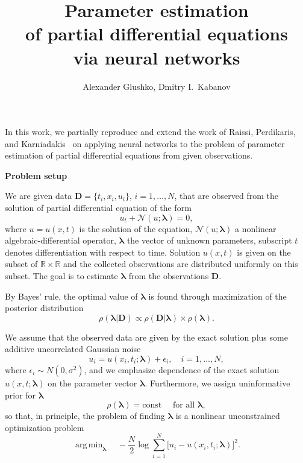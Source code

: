 \documentclass[a4paper, 12pt, parskip]{scrartcl}
\title{\vspace{-0.5cm}Parameter estimation\\of partial differential
        equations\\via neural networks}
\author{Alexander Glushko, Dmitry I.\ Kabanov}
\newcommand{\Data}{\vec{D}}
\renewcommand{\vec}[1]{\boldsymbol{#1}}
\newcommand{\VTheta}{\ensuremath{\vec{\theta}}}
\newcommand{\VLambda}{\ensuremath{\vec{\lambda}}}
\DeclareMathOperator*{\argmin}{arg\,min}
\newcommand{\R}{\mathbb R}
\newcommand{\NonlinOp}{\mathcal N\!}
\begin{document}
\maketitle

In this work, we partially reproduce and extend the work of Raissi, Perdikaris,
and Karniadakis~\cite{raissi2017pinnII} on applying neural networks to the
problem of parameter estimation of partial differential equations from given
observations.

\textbf{Problem setup}

We are given data $\Data = \{t_i, x_i, u_i\}$, $i=1, \dots, N$, that
are observed from the solution of partial differential equation of the form
\begin{equation}
    \label{eq:pde}
    u_t + \mathcal N\!(u; \VLambda) = 0,
\end{equation}
where  $u=u(x, t)$ is the solution of the equation,
$\NonlinOp(u; \VLambda)$ a nonlinear algebraic-differential operator,
$\VLambda$ the vector of unknown parameters, subscript $t$ denotes
differentiation with respect to time.
Solution $u(x,t)$ is given on the subset of $\R \times \R$ and the collected
observations are distributed uniformly on this subset.
The goal is to estimate $\VLambda$ from the observations $\Data$.

By Bayes' rule, the optimal value of $\VLambda$ is found through
maximization of the posterior distribution \cite{sivia2006data}
\begin{equation}
    \rho( \VLambda | \Data ) \propto
    \rho( \Data | \VLambda ) \times \rho( \VLambda ).
\end{equation}

We assume that the observed data are given by the exact solution plus some
additive uncorrelated Gaussian noise
\begin{equation}
    u_i = u(x_i, t_i; \VLambda) + \epsilon_i, \quad i=1, \dots, N,
\end{equation}
where $\epsilon_i \sim N(0, \sigma^2)$, and we emphasize dependence of the exact
solution $u(x, t; \VLambda)$ on the parameter vector $\VLambda$.
Furthermore, we assign uninformative prior for $\VLambda$
\begin{equation}
    \rho(\vec{\lambda}) = \text{const} \quad \text{ for all } \vec{\lambda},
\end{equation}
so that, in principle,
the problem of finding $\VLambda$ is a nonlinear unconstrained
optimization problem
\begin{equation}
    \label{eq:optim-ideal}
    \argmin_{\VLambda} \quad 
    -\frac{N}{2} \log \sum_{i=1}^{N} \big[ u_i - u(x_i, t_i; \VLambda) \big]^2.
\end{equation}
\end{document}
